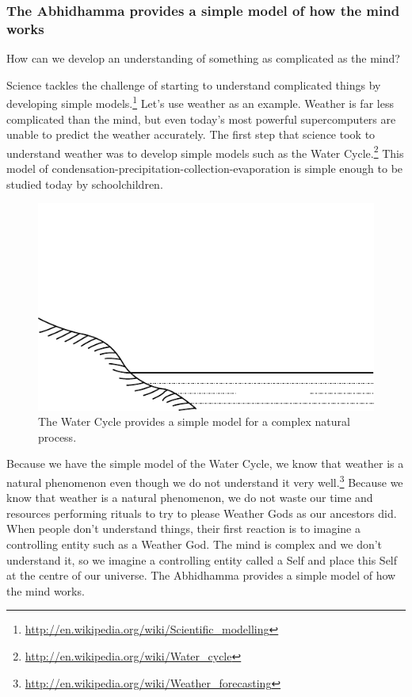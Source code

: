 \subsubsection*{The Abhidhamma provides a simple model of how the mind works}

How can we develop an understanding of something as complicated as the mind? 

Science tackles the challenge of starting to understand complicated things by developing simple models.\footnote{\url{http://en.wikipedia.org/wiki/Scientific_modelling}} Let’s use weather as an example. Weather is far less complicated than the mind, but even today’s most powerful supercomputers are unable to predict the weather accurately. The first step that science took to understand weather was to develop simple models such as the Water Cycle.\footnote{\url{http://en.wikipedia.org/wiki/Water_cycle}} This model of condensation-precipitation-collection-evaporation is simple enough to be studied today by schoolchildren.

\begin{figure}[H]
\centering
\includegraphics[width=0.85\linewidth]{./Diagrams/Rain}
\caption{The Water Cycle provides a simple model for a complex natural process.}
\label{fig:Rain}
\end{figure}

Because we have the simple model of the Water Cycle, we know that weather is a natural phenomenon even though we do not understand it very well.\footnote{\url{http://en.wikipedia.org/wiki/Weather_forecasting}} Because we know that weather is a natural phenomenon, we do not waste our time and resources performing rituals to try to please Weather Gods as our ancestors did. When people don’t understand things, their first reaction is to imagine a controlling entity such as a Weather God. The mind is complex and we don’t understand it, so we imagine a controlling entity called a Self and place this Self at the centre of our universe. The Abhidhamma provides a simple model of how the mind works.

